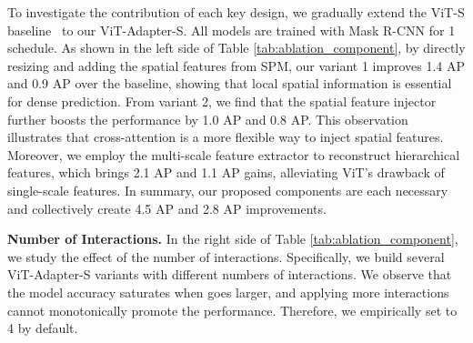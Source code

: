 \documentclass{article} \usepackage{iclr2023_conference,times}
\begin{document}
To investigate the contribution of each key design, we gradually extend the ViT-S baseline~\citep{li2021benchmarking} to our ViT-Adapter-S. 
All models are trained with Mask R-CNN for 1 schedule.
As shown in the left side of Table \ref{tab:ablation_component}, by directly resizing and adding the spatial features from SPM, our variant 1 improves 1.4 AP and 0.9 AP over the baseline, showing that local spatial information is essential for dense prediction.
From variant 2, we find that the spatial feature injector further boosts the performance by 1.0 AP and 0.8 AP.
This observation illustrates that cross-attention is a more flexible way to inject spatial features.
Moreover, we employ the multi-scale feature extractor to reconstruct hierarchical features, which brings 2.1 AP and 1.1 AP gains, alleviating ViT's drawback of single-scale features.
In summary, our proposed components are each necessary and collectively create 4.5 AP and 2.8 AP improvements.


\noindent \textbf{Number of Interactions.}
In the right side of Table \ref{tab:ablation_component}, we study the effect of the number of interactions. 
Specifically, we build several ViT-Adapter-S variants with different numbers of interactions.
We observe that the model accuracy saturates when  goes larger, and applying more interactions cannot monotonically promote the performance.
Therefore, we empirically set  to 4 by default. 

\begin{table}[t!]\small
\centering
\renewcommand\arraystretch{0.95}
\caption{\textbf{Ablation of using different attention mechanisms in our adapter.}
The per-iteration training time and GPU training memory are measured by A100 GPUs with per-GPU batch size 2 and FP16 training.
``*" indicates using activation checkpointing to save training memory.
}
\label{tab:ablation_attn}
\end{table} 
\end{document}
